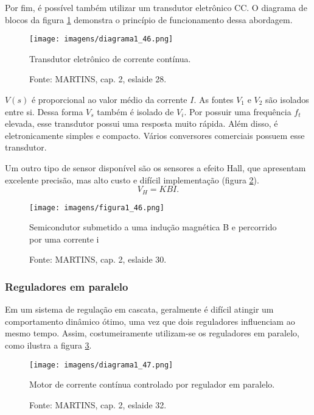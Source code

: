Por fim, é possível também utilizar um transdutor eletrônico CC. O diagrama de blocos da figura \ref{fig:D1_46} demonstra o princípio de funcionamento dessa abordagem.

\begin{figure}[ht!]
\center
\texttt{[image: imagens/diagrama1\_46.png]}
\caption{\label{fig:D1_46} Transdutor eletrônico de corrente contínua.}
\caption*{Fonte: MARTINS, cap. 2, eslaide 28.}
\end{figure}

$V(s)$ é proporcional ao valor médio da corrente $I$. As fontes $V_{1}$ e $V_{2}$ são isolados entre si. Dessa forma $V_{s}$ também é isolado de $V_{i}$. Por possuir uma frequência $f_{t}$ elevada, esse transdutor possui uma resposta muito rápida. Além disso, é eletronicamente simples e compacto. Vários conversores comerciais possuem esse transdutor.

Um outro tipo de sensor disponível são os sensores a efeito Hall, que apresentam excelente precisão, mas alto custo e difícil implementação (figura \ref{fig:F1_46}).
\[V_{H} = KBI.\]

\begin{figure}[ht!]
\center
\texttt{[image: imagens/figura1\_46.png]}
\caption{\label{fig:F1_46} Semicondutor submetido a uma indução magnética B e percorrido por uma corrente i}
\caption*{Fonte: MARTINS, cap. 2, eslaide 30.}
\end{figure}

\subsubsection{Reguladores em paralelo}

Em um sistema de regulação em cascata, geralmente é difícil atingir um comportamento dinâmico ótimo, uma vez que dois reguladores influenciam ao mesmo tempo. Assim, costumeiramente utilizam-se os reguladores em paralelo, como ilustra a figura \ref{fig:D1_47}.

\begin{figure}[ht!]
\center
\texttt{[image: imagens/diagrama1\_47.png]}
\caption{\label{fig:D1_47} Motor de corrente contínua controlado por regulador em paralelo.}
\caption*{Fonte: MARTINS, cap. 2, eslaide 32.}
\end{figure}

